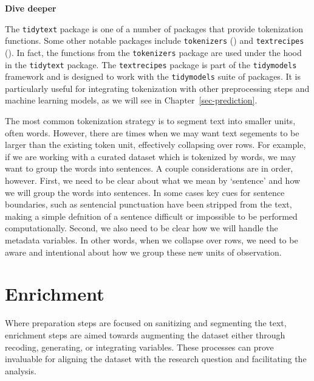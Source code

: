 \documentclass[
  letterpaper,
  DIV=11,
  numbers=noendperiod]{scrreprt}
\theoremstyle{definition}
\theoremstyle{remark}
\begin{document}
\begin{tcolorbox}[enhanced jigsaw, leftrule=.75mm, colframe=quarto-callout-color-frame, colback=white, rightrule=.15mm, opacityback=0, arc=.35mm, breakable, bottomrule=.15mm, left=2mm, toprule=.15mm]

\textbf{ Dive deeper}

The \texttt{tidytext} package is one of a number of packages that
provide tokenization functions. Some other notable packages include
\texttt{tokenizers} () and
\texttt{textrecipes} (). In
fact, the functions from the \texttt{tokenizers} package are used under
the hood in the \texttt{tidytext} package. The \texttt{textrecipes}
package is part of the \texttt{tidymodels} framework and is designed to
work with the \texttt{tidymodels} suite of packages. It is particularly
useful for integrating tokenization with other preprocessing steps and
machine learning models, as we will see in Chapter~\ref{sec-prediction}.

\end{tcolorbox}

The most common tokenization strategy is to segment text into smaller
units, often words. However, there are times when we may want text
segements to be larger than the existing token unit, effectively
collapsing over rows. For example, if we are working with a curated
dataset which is tokenized by words, we may want to group the words into
sentences. A couple considerations are in order, however. First, we need
to be clear about what we mean by `sentence' and how we will group the
words into sentences. In some cases key cues for sentence boundaries,
such as sentencial punctuation have been stripped from the text, making
a simple defnition of a sentence difficult or impossible to be performed
computationally. Second, we also need to be clear how we will handle the
metadata variables. In other words, when we collapse over rows, we need
to be aware and intentional about how we group these new units of
observation.

\section{Enrichment}\label{sec-td-enrichment}

Where preparation steps are focused on sanitizing and segmenting the
text, enrichment steps are aimed towards augmenting the dataset either
through recoding, generating, or integrating variables. These processes
can prove invaluable for aligning the dataset with the research question
and facilitating the analysis.
\end{document}
